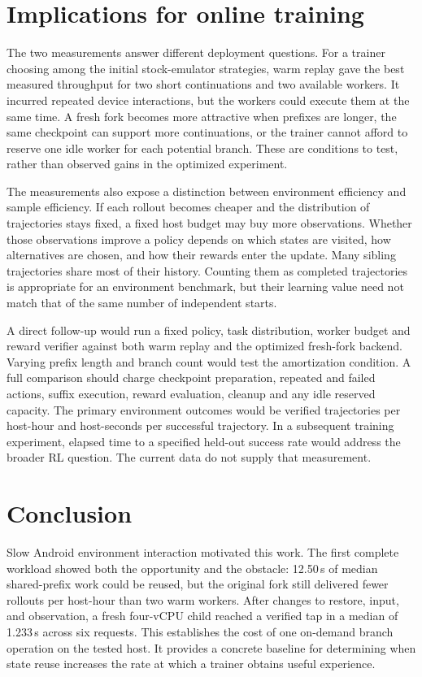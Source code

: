 \documentclass[11pt,letterpaper]{article}
\begin{document}
\clearpage
\section{Implications for online training}
The two measurements answer different deployment questions. For a trainer choosing among the initial stock-emulator strategies, warm replay gave the best measured throughput for two short continuations and two available workers. It incurred repeated device interactions, but the workers could execute them at the same time. A fresh fork becomes more attractive when prefixes are longer, the same checkpoint can support more continuations, or the trainer cannot afford to reserve one idle worker for each potential branch. These are conditions to test, rather than observed gains in the optimized experiment.

The measurements also expose a distinction between environment efficiency and sample efficiency. If each rollout becomes cheaper and the distribution of trajectories stays fixed, a fixed host budget may buy more observations. Whether those observations improve a policy depends on which states are visited, how alternatives are chosen, and how their rewards enter the update. Many sibling trajectories share most of their history. Counting them as completed trajectories is appropriate for an environment benchmark, but their learning value need not match that of the same number of independent starts.

A direct follow-up would run a fixed policy, task distribution, worker budget and reward verifier against both warm replay and the optimized fresh-fork backend. Varying prefix length and branch count would test the amortization condition. A full comparison should charge checkpoint preparation, repeated and failed actions, suffix execution, reward evaluation, cleanup and any idle reserved capacity. The primary environment outcomes would be verified trajectories per host-hour and host-seconds per successful trajectory. In a subsequent training experiment, elapsed time to a specified held-out success rate would address the broader RL question. The current data do not supply that measurement.

\section{Conclusion}
Slow Android environment interaction motivated this work. The first complete workload showed both the opportunity and the obstacle: 12.50\,s of median shared-prefix work could be reused, but the original fork still delivered fewer rollouts per host-hour than two warm workers. After changes to restore, input, and observation, a fresh four-vCPU child reached a verified tap in a median of 1.233\,s across six requests. This establishes the cost of one on-demand branch operation on the tested host. It provides a concrete baseline for determining when state reuse increases the rate at which a trainer obtains useful experience.
\end{document}
